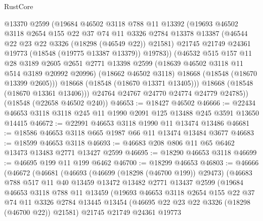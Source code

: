 \begin{lexlean}{RustCore}
\begin{coremodule}
            @13370
            @2599
            (@19684
              @46502
              @3118
              @788
              @11
              @13392
              (@19693
                @46502
                @3118
                @2654
                @155
                @22
                @37
                @74
                @11
                @3326
                @2784
                @13378
                @13387
                (@46544 @22 @23 @22 @3326 (@18298 (@46549 @22)) @21581)
                @21745
                @21749
                @24361
                @19773
                (@18548 (@19775 @13387 @13379))
                @19783))
            (@46532
              @515
              @157
              @11
              @28
              @3189
              @2605
              @2651
              @2771
              @13398
              @2599
              (@18639 @46502 @3118 @11 @514 @3189 @20992 @20996)
              (@18662 @46502 @3118)
              @18668
              (@18548 (@18670 @13399 @2605)))
            @18668
            (@18548 (@18670 @13371 @13405)))
          @18668
          (@18548 (@18670 @13361 @13406)))
        @24764
        @24767
        @24770
        @24774
        @24779
        @24785))
    (@18548 (@22658 @46502 @240))
@46653 := @18427 @46502
@46666 := @22434 @46653 @3118 @3118 @245 @11 @1990 @2091 @125 @13488 @245 @3591 @13650 @14415
@46672 := @22991 @46653 @3118 @1990 @11 @13474 @13486
@46681 := @18586 @46653 @3118 @665 @1987 @66 @11 @13474 @13484 @3677
@46683 := @18599 @46653 @3118
@46693 := @46683 @208 @806 @11 @65 @6462 @13473 @13483 @2771 @13427 @2599
@46695 := @18290 @46653 @3118
@46699 := @46695 @199 @11 @199 @6462
@46700 := @18299 @46653
@46803 := @46666
    (@46672
      (@46681
        (@46693
          (@46699 (@18298 (@46700 @199)) @29473)
          (@46683
            @788
            @517
            @11
            @40
            @13459
            @13472
            @13482
            @2771
            @13437
            @2599
            (@19684
              @46653
              @3118
              @788
              @11
              @13459
              (@19693
                @46653
                @3118
                @2654
                @155
                @22
                @37
                @74
                @11
                @3326
                @2784
                @13445
                @13454
                (@46695 @22 @23 @22 @3326 (@18298 (@46700 @22)) @21581)
                @21745
                @21749
                @24361
                @19773

\end{coremodule}
\end{lexlean}
